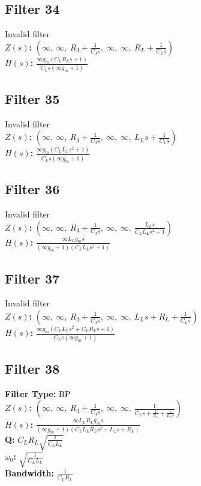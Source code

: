 \documentclass{article}
\begin{document}
\subsection*{Filter 34}
Invalid filter \\ 
\textbf{$Z(s)$:} $\left( \infty, \  \infty, \  R_{3} + \frac{1}{C_{3} s}, \  \infty, \  \infty, \  R_{L} + \frac{1}{C_{L} s}\right)$ \\ 
\textbf{$H(s)$:} $\frac{\infty g_{m} \left(C_{L} R_{L} s + 1\right)}{C_{L} s \left(\infty g_{m} + 1\right)}$ \\ 
\subsection*{Filter 35}
Invalid filter \\ 
\textbf{$Z(s)$:} $\left( \infty, \  \infty, \  R_{3} + \frac{1}{C_{3} s}, \  \infty, \  \infty, \  L_{L} s + \frac{1}{C_{L} s}\right)$ \\ 
\textbf{$H(s)$:} $\frac{\infty g_{m} \left(C_{L} L_{L} s^{2} + 1\right)}{C_{L} s \left(\infty g_{m} + 1\right)}$ \\ 
\subsection*{Filter 36}
Invalid filter \\ 
\textbf{$Z(s)$:} $\left( \infty, \  \infty, \  R_{3} + \frac{1}{C_{3} s}, \  \infty, \  \infty, \  \frac{L_{L} s}{C_{L} L_{L} s^{2} + 1}\right)$ \\ 
\textbf{$H(s)$:} $\frac{\infty L_{L} g_{m} s}{\left(\infty g_{m} + 1\right) \left(C_{L} L_{L} s^{2} + 1\right)}$ \\ 
\subsection*{Filter 37}
Invalid filter \\ 
\textbf{$Z(s)$:} $\left( \infty, \  \infty, \  R_{3} + \frac{1}{C_{3} s}, \  \infty, \  \infty, \  L_{L} s + R_{L} + \frac{1}{C_{L} s}\right)$ \\ 
\textbf{$H(s)$:} $\frac{\infty g_{m} \left(C_{L} L_{L} s^{2} + C_{L} R_{L} s + 1\right)}{C_{L} s \left(\infty g_{m} + 1\right)}$ \\ 
\subsection*{Filter 38}
\textbf{Filter Type:} BP \\ 
\textbf{$Z(s)$:} $\left( \infty, \  \infty, \  R_{3} + \frac{1}{C_{3} s}, \  \infty, \  \infty, \  \frac{1}{C_{L} s + \frac{1}{R_{L}} + \frac{1}{L_{L} s}}\right)$ \\ 
\textbf{$H(s)$:} $\frac{\infty L_{L} R_{L} g_{m} s}{\left(\infty g_{m} + 1\right) \left(C_{L} L_{L} R_{L} s^{2} + L_{L} s + R_{L}\right)}$ \\ 
\textbf{Q:} $C_{L} R_{L} \sqrt{\frac{1}{C_{L} L_{L}}}$ \\ 
\textbf{$\omega_0$:} $\sqrt{\frac{1}{C_{L} L_{L}}}$ \\ 
\textbf{Bandwidth:} $\frac{1}{C_{L} R_{L}}$ \\ 
\end{document}
